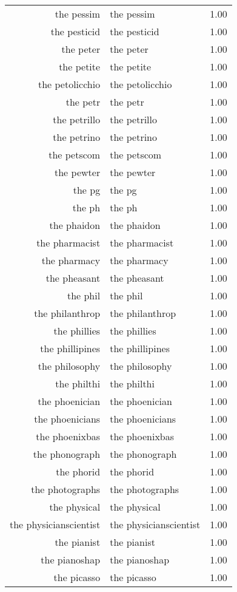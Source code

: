 \begin{table}[ht]
\begin{tabular}{rlr}
  the pessim & the pessim & 1.00 \\ 
  the pesticid & the pesticid & 1.00 \\ 
  the peter & the peter & 1.00 \\ 
  the petite & the petite & 1.00 \\ 
  the petolicchio & the petolicchio & 1.00 \\ 
  the petr & the petr & 1.00 \\ 
  the petrillo & the petrillo & 1.00 \\ 
  the petrino & the petrino & 1.00 \\ 
  the petscom & the petscom & 1.00 \\ 
  the pewter & the pewter & 1.00 \\ 
  the pg & the pg & 1.00 \\ 
  the ph & the ph & 1.00 \\ 
  the phaidon & the phaidon & 1.00 \\ 
  the pharmacist & the pharmacist & 1.00 \\ 
  the pharmacy & the pharmacy & 1.00 \\ 
  the pheasant & the pheasant & 1.00 \\ 
  the phil & the phil & 1.00 \\ 
  the philanthrop & the philanthrop & 1.00 \\ 
  the phillies & the phillies & 1.00 \\ 
  the phillipines & the phillipines & 1.00 \\ 
  the philosophy & the philosophy & 1.00 \\ 
  the philthi & the philthi & 1.00 \\ 
  the phoenician & the phoenician & 1.00 \\ 
  the phoenicians & the phoenicians & 1.00 \\ 
  the phoenixbas & the phoenixbas & 1.00 \\ 
  the phonograph & the phonograph & 1.00 \\ 
  the phorid & the phorid & 1.00 \\ 
  the photographs & the photographs & 1.00 \\ 
  the physical & the physical & 1.00 \\ 
  the physicianscientist & the physicianscientist & 1.00 \\ 
  the pianist & the pianist & 1.00 \\ 
  the pianoshap & the pianoshap & 1.00 \\ 
  the picasso & the picasso & 1.00 \\ 

\end{tabular}
\end{table}

